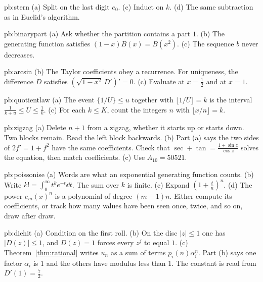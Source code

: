 \begin{hint}{pb:stern}
(a) Split on the last digit $e_0$. (c) Induct on $k$. (d) The same subtraction as in Euclid's algorithm.
\end{hint}

\begin{hint}{pb:binarypart}
(a) Ask whether the partition contains a part $1$. (b) The generating function satisfies $(1-x)B(x)=B(x^2)$. (c) The sequence $b$ never decreases.
\end{hint}

\begin{hint}{pb:arcsin}
(b) The Taylor coefficients obey a recurrence. For uniqueness, the difference $D$ satisfies $(\sqrt{1-x^2}\,D')'=0$.
(c) Evaluate at $x=\frac12$ and at $x=1$.
\end{hint}

\begin{hint}{pb:quotientlaw}
(a) The event $\{1/U\}\le u$ together with $\lfloor 1/U\rfloor=k$ is the interval $\frac1{k+u}\le U\le\frac1k$. (c) For each $k\le K$, count the integers $n$ with $\lfloor x/n\rfloor=k$.
\end{hint}

\begin{hint}{pb:zigzag}
(a) Delete $n+1$ from a zigzag, whether it starts up or starts down. Two blocks remain. Read the left block backwards. (b) Part (a) says the two sides of $2f'=1+f^2$ have the
same coefficients. Check that $\sec+\tan=\frac{1+\sin z}{\cos z}$ solves the equation, then match coefficients. (c) Use $A_{10}=50521$.
\end{hint}

\begin{hint}{pb:poissonise}
(a) Words are what an exponential generating function counts. (b) Write $k!=\int_0^\infty t^ke^{-t}\dd t$. The sum over $k$ is finite. (c) Expand $(1+\frac tn)^n$. (d) The power $e_m(x)^n$ is a polynomial of degree $(m-1)n$.
Either compute its coefficients, or track how many values have been seen once, twice, and so on, draw after draw.
\end{hint}

\begin{hint}{pb:diehit}
(a) Condition on the first roll. (b) On the disc $|z|\le1$ one has $|D(z)|\le1$, and $D(z)=1$ forces every $z^j$ to equal $1$. (c) Theorem~\ref{thm:rational} writes $u_n$ as a sum of terms $p_i(n)\alpha_i^n$.
Part (b) says one factor $\alpha_i$ is $1$ and the others have modulus less than $1$. The constant is read from $D'(1)=\frac72$.
\end{hint}


